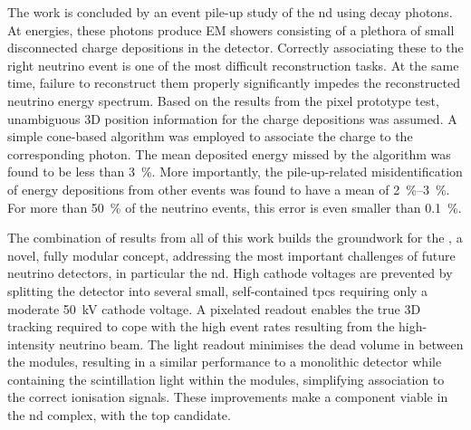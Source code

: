The work is concluded by an event pile-up study of the \dune{} \gls{nd} using \Pgpz decay photons.
At \dune{} energies, these photons produce EM showers consisting of a plethora of small disconnected charge depositions in the detector.
Correctly associating these to the right neutrino event is one of the most difficult reconstruction tasks.
At the same time, failure to reconstruct them properly significantly impedes the reconstructed neutrino energy spectrum.
Based on the results from the pixel prototype test, unambiguous 3D position information for the charge depositions was assumed.
A simple cone-based algorithm was employed to associate the charge to the corresponding photon.
The mean deposited energy missed by the algorithm was found to be less than \SI{3}{\percent}.
More importantly, the pile-up-related misidentification of energy depositions from other events was found to have a mean of \SIrange{2}{3}{\percent}.
For more than \SI{50}{\percent} of the neutrino events, this error is even smaller than \SI{0.1}{\percent}.

The combination of results from all of this work builds the groundwork for the \AC{}, a novel, fully modular \lartpc{} concept, addressing the most important challenges of future neutrino detectors, in particular the \dune{} \gls{nd}.
High cathode voltages are prevented by splitting the detector into several small, self-contained \glspl{tpc} requiring only a moderate \SI{50}{\kilo\volt} cathode voltage.
A pixelated readout enables the true 3D tracking required to cope with the high event rates resulting from the high-intensity neutrino beam.
The \AL{} light readout minimises the dead volume in between the modules, resulting in a similar performance to a monolithic detector while containing the scintillation light within the modules, simplifying association to the correct ionisation signals.
These improvements make a \lartpc{} component viable in the \dune{} \gls{nd} complex, with \AC{} the top candidate.
